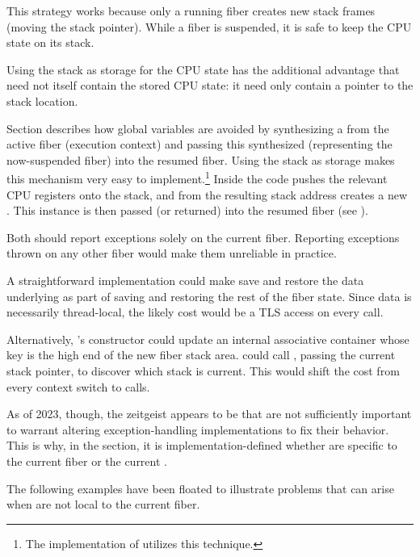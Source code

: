 This strategy works because only a running fiber creates new stack frames
(moving the stack pointer). While a fiber is suspended, it is safe to keep the
CPU state on its stack.

Using the stack as storage for the CPU state has the additional advantage
that \fiber need not itself contain the stored CPU state: it need only contain
a pointer to the stack location.

Section  describes how global variables are avoided
by synthesizing a \fiber from the active fiber (execution context) and passing
this synthesized \fiber (representing the now-suspended fiber) into the resumed
fiber. Using the stack as storage makes this mechanism very easy to
implement.\footnote{The implementation of \bcontext\cite{bcontext} utilizes this
technique.}
Inside \resume the code pushes the relevant CPU registers onto the stack, and
from the resulting stack address creates a new \fiber. This instance is then
passed (or returned) into the resumed fiber (see ).


\abschnitt{\exfns}\label{exc_scope}

Both \exfns should report exceptions solely on the current fiber.
Reporting exceptions thrown on any other fiber would make them
unreliable in practice.

A straightforward implementation could make \allresume save and restore the
data underlying \exfns as part of saving and restoring the rest of the fiber
state. Since \exfns data is necessarily thread-local, the likely cost would be
a TLS access on every \anyresume call.

Alternatively, \fiber's constructor could update an internal associative
container whose key is the high end of the new fiber stack area. \exfns could
call , passing the current stack pointer, to discover
which stack is current. This would shift the cost from every context switch
to \exfns calls.

As of 2023, though, the zeitgeist appears to be that \exfns are not sufficiently
important to warrant altering exception-handling implementations to fix their
behavior. This is why, in the  section, it is
implementation-defined whether \exfns are specific to the current fiber
or the current \thread.

The following examples have been floated to illustrate problems that can arise
when \exfns are not local to the current fiber.

